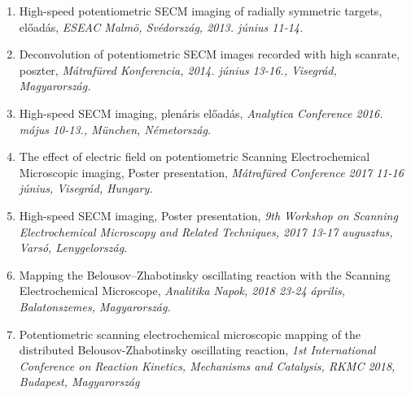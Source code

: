\documentclass[11pt,a4paper,roman]{article}
\begin{document}
\begin{enumerate}
\item High-speed potentiometric SECM imaging of radially symmetric targets, előadás, \emph{ESEAC Malmö, Svédország, 2013. június 11-14.}

\item Deconvolution of potentiometric SECM images recorded with high scanrate, poszter, \emph{Mátrafüred Konferencia, 2014. június 13-16., Visegrád, Magyarország.}

\item High-speed SECM imaging, plenáris előadás, \emph{Analytica Conference 2016. május 10-13., München, Németország.}

\item The effect of electric field on potentiometric Scanning Electrochemical Microscopic imaging, Poster presentation, \emph{Mátrafüred Conference 2017 11-16 június, Visegrád, Hungary.}

\item High-speed SECM imaging, Poster presentation, \emph{9th Workshop on Scanning Electrochemical Microscopy and Related Techniques, 2017 13-17 augusztus, Varsó, Lenygelország.}

\item Mapping the Belousov--Zhabotinsky oscillating reaction with the Scanning Electrochemical Microscope, \emph{Analitika Napok, 2018 23-24 április, Balatonszemes, Magyarország.}

\item Potentiometric scanning electrochemical microscopic mapping of the distributed Belousov-Zhabotinsky oscillating reaction, \emph{1st International Conference on Reaction Kinetics, Mechanisms and Catalysis, RKMC 2018, Budapest, Magyarország}


\end{enumerate}
\end{document}
